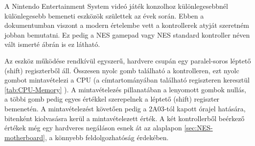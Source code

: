 	A Nintendo Entertainment System videó játék konzolhoz különlegesebbnél különlegesebb bemeneti eszközök születtek az évek során. Ebben a dokumentumban viszont a modern értelembe vett a kontrollerek atyját szeretném jobban bemutatni. Ez pedig a NES gamepad vagy NES standard kontroller néven vált ismerté  ábrán is ez látható.
	
	Az eszköz működése rendkívül egyszerű, hardvere csupán egy paralel-soros léptető (shift) regiszterből áll. Összesen nyolc gomb található a kontrolleren, ezt nyolc gombot mintavételezi a CPU (a címtartományában található regiszteren keresztül \ref{tab:CPU-Memory} ). A mintavételezés pillanatában a lenyomott gombok nullás, a többi gomb pedig egyes értékkel szerepelnek a léptető (shift) regiszter bemenetén. A mintavételezést követően pedig a 2A03-tól kapott órajel hatására, bitenként kiolvasásra kerül a mintavételezett érték. A két kontrollerből beérkező értékek még egy hardveres negáláson esnek át az alaplapon \ref{sec:NES-motherboard}, a könnyebb feldolgozhatóság érdekében. 